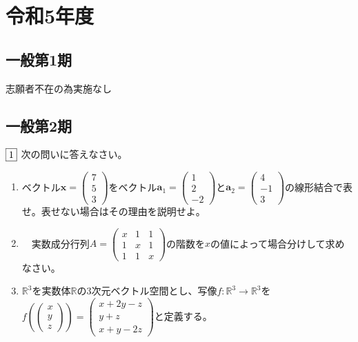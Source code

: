 \documentclass[dvipdfmx]{jsreport}
\newcommand{\R}{\mathbb{R}}
\newcounter{num}[section]
\begin{document}
\chapter{令和5年度}
\section{一般第1期}
	志願者不在の為実施なし

\section{一般第2期}
\begin{tcolorbox} %
	$\fbox{1}$ 次の問いに答えなさい。
\begin{enumerate}
	\item ベクトル$\bm{x}= \begin{pmatrix}7\\ 5\\ 3\end{pmatrix}$をベクトル$\bm{a}_1= \begin{pmatrix}1\\ 2\\ -2\end{pmatrix}$と$\bm{a}_2= \begin{pmatrix}4\\ -1\\ 3\end{pmatrix}$の線形結合で表せ。表せない場合はその理由を説明せよ。
	\item　実数成分行列$A= \begin{pmatrix}x& 1& 1\\ 1& x& 1\\ 1& 1& x\end{pmatrix}$の階数を$x$の値によって場合分けして求めなさい。
	\item $\R^3$を実数体$\R$の3次元ベクトル空間とし、写像$f\colon \R^3\to \R^3$を$f\left(\begin{pmatrix}x\\ y\\ z\end{pmatrix}\right)= \begin{pmatrix}{x+ 2y- z}\\ {y+ z}\\ {x+ y- 2z}\end{pmatrix}$と定義する。
\end{enumerate}
\end{tcolorbox}
\end{document}

